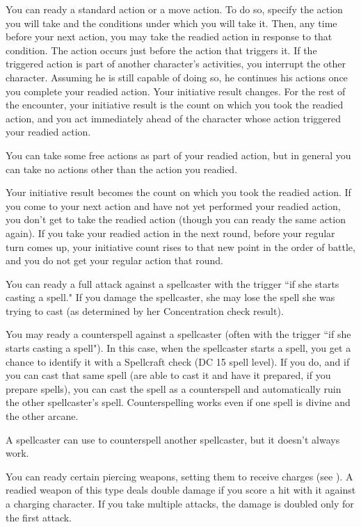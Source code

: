  You can ready a standard action or a move action. To do so, specify the action you will take and the conditions under which you will take it. Then, any time before your next action, you may take the readied action in response to that condition. The action occurs just before the action that triggers it. If the triggered action is part of another character's activities, you interrupt the other character. Assuming he is still capable of doing so, he continues his actions once you complete your readied action. Your initiative result changes. For the rest of the encounter, your initiative result is the count on which you took the readied action, and you act immediately ahead of the character whose action triggered your readied action.

You can take some free actions as part of your readied action, but in general you can take no actions other than the action you readied.

 Your initiative result becomes the count on which you took the readied action. If you come to your next action and have not yet performed your readied action, you don't get to take the readied action (though you can ready the same action again). If you take your readied action in the next round, before your regular turn comes up, your initiative count rises to that new point in the order of battle, and you do not get your regular action that round.

 You can ready a full attack against a spellcaster with the trigger ``if she starts casting a spell." If you damage
the spellcaster, she may lose the spell she was trying to cast (as determined by her Concentration check result).

 You may ready a counterspell against a spellcaster (often with the trigger ``if she starts casting a spell"). In this case, when the spellcaster starts a spell, you get a chance to identify it with a Spellcraft check (DC 15 \add spell level). If you do, and if you can cast that same spell (are able to cast it and have it prepared, if you prepare spells), you can cast the spell as a counterspell and automatically ruin the other spellcaster's spell. Counterspelling works even if one spell is divine and the other arcane.

A spellcaster can use  to counterspell another spellcaster, but it doesn't always work.

 You can ready certain piercing weapons, setting them to receive charges (see ). A readied weapon of this type deals double damage if you score a hit with it against a charging character. If you take multiple attacks, the damage is doubled only for the first attack.
